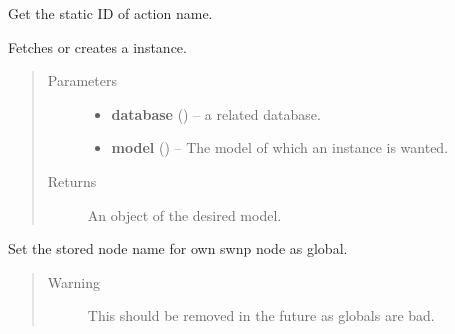 \documentclass[letterpaper,10pt,english]{sphinxmanual}
\begin{document}

\begin{fulllineitems}
\label{controller:controller.common.get_action_id_by_name}
Get the static ID of action name.

\end{fulllineitems}


\begin{fulllineitems}
\label{controller:controller.common.get_or_create}
Fetches or creates a instance.
\begin{quote}\begin{description}
\item[{Parameters}] \leavevmode\begin{itemize}
\item {} 
\textbf{database} () -- a related database.

\item {} 
\textbf{model} () -- The model of which an instance is wanted.

\end{itemize}

\item[{Returns}] \leavevmode
An object of the desired model.

\end{description}\end{quote}

\end{fulllineitems}


\begin{fulllineitems}
\label{controller:controller.common.set_node_name}
Set the stored node name for own swnp node as global.
\begin{quote}\begin{description}
\item[{Warning }] \leavevmode
This should be removed in the future as globals are bad.

\end{description}\end{quote}

\end{fulllineitems}
\end{document}
